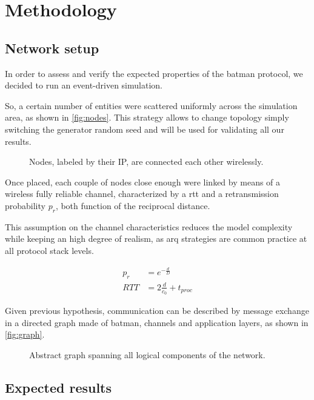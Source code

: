 \documentclass[conference]{IEEEtran}
\begin{document}
\section{Methodology}

\subsection{Network setup}

In order to assess and verify the expected properties of the \gls{batman}
protocol, we decided to run an event-driven simulation.

So, a certain number of entities were scattered uniformly across the simulation
area, as shown in \autoref{fig:nodes}. This strategy allows to change topology
simply switching the generator random seed and will be used for validating all our results.

\begin{figure}[h]
  \centering
  \caption{Nodes, labeled by their IP, are connected each other wirelessly.}
  \label{fig:nodes}
\end{figure}

Once placed, each couple of nodes close enough were linked by means of a
wireless fully reliable channel, characterized by a \gls{rtt} and a
retransmission probability $p_r$, both function of the reciprocal distance.

This assumption on the channel characteristics reduces the model complexity
while keeping an high degree of realism, as \gls{arq} strategies are common
practice at all protocol stack levels.

\begin{equation}
  \begin{split}
    p_r & = e^{-\frac{d}{D}} \\
    RTT &= 2 \frac{d}{c_0} + t_{proc}
  \end{split}
\end{equation}

Given previous hypothesis, communication can be described by message exchange in
a directed graph made of \gls{batman}, channels and application layers, as shown
in \autoref{fig:graph}.

\begin{figure}[h]
  \centering
  \caption{Abstract graph spanning all logical components of the network.}
  \label{fig:graph}
\end{figure}

\subsection{Expected results}
\end{document}
